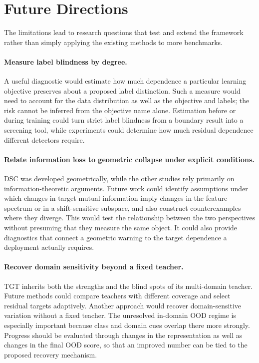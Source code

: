 \section{Future Directions}
\label{sec:concl:future}

The limitations lead to research questions that test and extend the framework
rather than simply applying the existing methods to more benchmarks.

\paragraph{Measure label blindness by degree.}
A useful diagnostic would estimate how much dependence a particular learning
objective preserves about a proposed label distinction. Such a measure would need
to account for the data distribution as well as the objective and labels; the risk
cannot be inferred from the objective name alone. Estimation before or during
training could turn strict label blindness from a boundary result into a screening
tool, while experiments could determine how much residual dependence different
detectors require.

\paragraph{Relate information loss to geometric collapse under explicit
conditions.}
DSC was developed geometrically, while the other studies rely primarily on
information-theoretic arguments. Future work could identify assumptions under which
changes in target mutual information imply changes in the feature spectrum or in a
shift-sensitive subspace, and also construct counterexamples where they diverge.
This would test the relationship between the two perspectives without presuming
that they measure the same object. It could also provide diagnostics that connect a
geometric warning to the target dependence a deployment actually requires.

\paragraph{Recover domain sensitivity beyond a fixed teacher.}
TGT inherits both the strengths and the blind spots of its multi-domain teacher.
Future methods could compare teachers with different coverage and select residual
targets adaptively. Another approach would recover domain-sensitive variation
without a fixed teacher.
The unresolved in-domain OOD regime is especially important because class and domain
cues overlap there more strongly. Progress should be evaluated through changes in
the representation as well as changes in the final OOD score, so that an improved
number can be tied to the proposed recovery mechanism.

